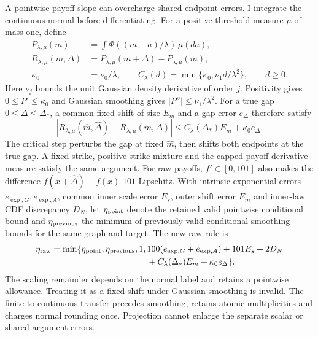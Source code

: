 \documentclass[11pt]{article}
\begin{document}
A pointwise payoff slope can overcharge shared endpoint errors. I integrate
the continuous normal before differentiating. For a positive threshold
measure $\mu$ of mass one, define
\begin{equation}
\begin{aligned}
P_{\lambda,\mu}(m)&=\int\Phi((m-a)/\lambda)\,\mu(da),\\
R_{\lambda,\mu}(m,\Delta)&=P_{\lambda,\mu}(m+\Delta)-P_{\lambda,\mu}(m),\\
\kappa_0&=\nu_0/\lambda,\qquad
C_\lambda(d)=\min\{\kappa_0,\nu_1d/\lambda^2\},\qquad d\geq0.
\end{aligned}
\label{eq:matched-common-shift-definition}
\end{equation}
Here $\nu_j$ bounds the unit Gaussian density derivative of order $j$.
Positivity gives $0\leq P'\leq\kappa_0$ and Gaussian smoothing gives
$|P''|\leq\nu_1/\lambda^2$. For a true gap
$0\leq\Delta\leq\Delta_*$, a common fixed shift of size $E_m$ and a
gap error $e_\Delta$ therefore satisfy
\begin{equation}
|R_{\lambda,\mu}(\widehat m,\widehat\Delta)
       -R_{\lambda,\mu}(m,\Delta)|
\leq C_\lambda(\Delta_*)E_m+\kappa_0e_\Delta.
\label{eq:matched-common-shift-stability}
\end{equation}
The critical step perturbs the gap at fixed $\widehat m$, then shifts
both endpoints at the true gap. A fixed strike, positive strike mixture
and the capped payoff derivative measure satisfy the same argument.
For raw payoffs, $f'\in[0,101]$ also makes the difference
$f(x+\widehat\Delta)-f(x)$ $101$-Lipschitz. With intrinsic exponential
errors $e_{\exp,G},e_{\exp,A}$, common inner scale error $E_s$, outer
shift error $E_m$ and inner-law CDF discrepancy $D_N$, let
$\eta_{\rm point}$ denote the retained valid pointwise conditional bound and
$\eta_{\rm previous}$ the minimum of previously valid conditional smoothing
bounds for the same graph and target. The new raw rule is
\begin{equation}
\begin{aligned}
\eta_{\rm raw}=\min\{\eta_{\rm point},\eta_{\rm previous},1,\,
&100(e_{\exp,G}+e_{\exp,A})+101E_s+2D_N\\
&+C_\lambda(\Delta_*)E_m+\kappa_0e_\Delta\}.
\end{aligned}
\label{eq:matched-common-shift-raw}
\end{equation}
The scaling remainder depends on the normal label and retains a pointwise
allowance. Treating it as a fixed shift under Gaussian smoothing is invalid.
The finite-to-continuous transfer precedes smoothing, retains atomic
multiplicities and charges normal rounding once. Projection cannot enlarge
the separate scalar or shared-argument errors.
\end{document}
